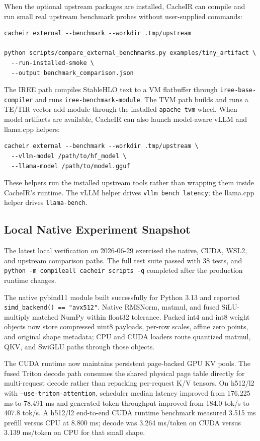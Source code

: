 \documentclass[11pt]{article}
\begin{document}
When the optional upstream packages are installed, CacheIR can compile and run
small real upstream benchmark probes without user-supplied commands:

\begin{lstlisting}
cacheir external --benchmark --workdir .tmp/upstream

python scripts/compare_external_benchmarks.py examples/tiny_artifact \
  --run-installed-smoke \
  --output benchmark_comparison.json
\end{lstlisting}

The IREE path compiles StableHLO text to a VM flatbuffer through
\texttt{iree-base-compiler} and runs \texttt{iree-benchmark-module}. The TVM
path builds and runs a TE/TIR vector-add module through the installed
\texttt{apache-tvm} wheel. When model artifacts are available, CacheIR can also
launch model-aware vLLM and llama.cpp helpers:

\begin{lstlisting}
cacheir external --benchmark --workdir .tmp/upstream \
  --vllm-model /path/to/hf_model \
  --llama-model /path/to/model.gguf
\end{lstlisting}

These helpers run the installed upstream tools rather than wrapping them inside
CacheIR's runtime. The vLLM helper drives \texttt{vllm bench latency}; the
llama.cpp helper drives \texttt{llama-bench}.

\subsection{Local Native Experiment Snapshot}

The latest local verification on 2026-06-29 exercised the native, CUDA, WSL2,
and upstream comparison paths. The full test suite passed with 38 tests, and
\texttt{python -m compileall cacheir scripts -q} completed after the production
runtime changes.

The native pybind11 module built successfully for Python 3.13 and reported
\texttt{simd\_backend() == "avx512"}. Native RMSNorm, matmul, and fused
SiLU-multiply matched NumPy within float32 tolerance. Packed int4 and int8
weight objects now store compressed uint8 payloads, per-row scales, affine zero
points, and original shape metadata; CPU and CUDA loaders route quantized
matmul, QKV, and SwiGLU paths through those objects.

The CUDA runtime now maintains persistent page-backed GPU KV pools. The fused
Triton decode path consumes the shared physical page table directly for
multi-request decode rather than repacking per-request K/V tensors. On h512/l2
with \texttt{--use-triton-attention}, scheduler median latency improved from
176.225 ms to 78.491 ms and generated-token throughput improved from
184.0 tok/s to 407.8 tok/s. A h512/l2 end-to-end CUDA runtime benchmark
measured 3.515 ms prefill versus CPU at 8.800 ms; decode was 3.264 ms/token on
CUDA versus 3.139 ms/token on CPU for that small shape.
\end{document}

